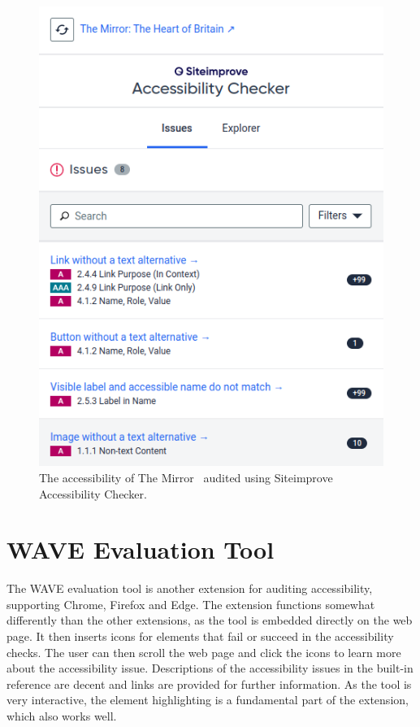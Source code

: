 \begin{figure}[tp]
\centering
\includegraphics[keepaspectratio,width=\linewidth,height=\halfh]
{images/siteimprove-ext.png}

\caption[Siteimprove Accessibility Checker]{
The accessibility of The Mirror~\parencite{MirrorUK} audited using Siteimprove Accessibility Checker.
}
\label{fig:siteimprove-ext}
\end{figure}

\section{WAVE Evaluation Tool}
The WAVE evaluation tool \parencite{wave} is another extension for auditing accessibility, supporting Chrome, Firefox and Edge.
The extension functions somewhat differently than the other extensions, as the tool is embedded directly on the web page.
It then inserts icons for elements that fail or succeed in the accessibility checks.
The user can then scroll the web page and click the icons to learn more about the accessibility issue.
Descriptions of the accessibility issues in the built-in reference are decent and links are provided for further information.
As the tool is very interactive, the element highlighting is a fundamental part of the extension, which also works well.

